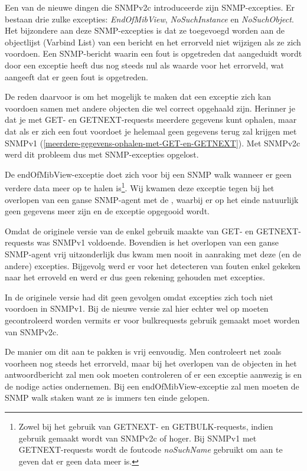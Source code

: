 Een van de nieuwe dingen die SNMPv2c introduceerde zijn SNMP-excepties.
Er bestaan drie zulke excepties: \textit{EndOfMibView}, \textit{NoSuchInstance} en \textit{NoSuchObject}.
Het bijzondere aan deze SNMP-excepties is dat ze toegevoegd worden aan de objectlijst (Varbind List) van een bericht
en het errorveld niet wijzigen als ze zich voordoen\cite{endOfMibView-error-status}.
Een SNMP-bericht waarin een fout is opgetreden dat aangeduidt wordt door een exceptie heeft dus nog steeds nul als waarde voor het errorveld,
wat aangeeft dat er geen fout is opgetreden.

De reden daarvoor is om het mogelijk te maken dat een exceptie zich kan voordoen samen met andere objecten die wel correct opgehaald zijn.
Herinner je dat je met GET- en GETNEXT-requests meerdere gegevens kunt ophalen,
maar dat als er zich een fout voordoet je helemaal geen gegevens terug zal krijgen met SNMPv1 (\cref{meerdere-gegevens-ophalen-met-GET-en-GETNEXT}).
Met SNMPv2c werd dit probleem dus met SNMP-excepties opgelost.

De endOfMibView-exceptie doet zich voor bij een SNMP walk wanneer er geen verdere data meer op te halen is\footnote{
	Zowel bij het gebruik van GETNEXT- en GETBULK-requests, indien gebruik gemaakt wordt van SNMPv2c of hoger.
	Bij SNMPv1 met GETNEXT-requests wordt de foutcode \textit{noSuchName} gebruikt om aan te geven dat er geen data meer is\cite{snmp-exceptions-v2c-to-v1}.
}\cite{snmp-exceptions-explained}.
Wij kwamen deze exceptie tegen bij het overlopen van een ganse SNMP-agent met de \nwmretriever{},
waarbij er op het einde natuurlijk geen gegevens meer zijn en de exceptie opgegooid wordt.

Omdat de originele versie van de \nwmretriever{} enkel gebruik maakte van GET- en GETNEXT-requests was SNMPv1 voldoende.
Bovendien is het overlopen van een ganse SNMP-agent vrij uitzonderlijk dus kwam men nooit in aanraking met deze (en de andere) excepties.
Bijgevolg werd er voor het detecteren van fouten enkel gekeken naar het erroveld en werd er dus geen rekening gehouden met excepties.

In de originele versie had dit geen gevolgen omdat excepties zich toch niet voordoen in SNMPv1.
Bij de nieuwe versie zal hier echter wel op moeten gecontroleerd worden vermits er voor bulkrequests gebruik gemaakt moet worden van SNMPv2c.

De manier om dit aan te pakken is vrij eenvoudig.
Men controleert net zoals voorheen nog steeds het errorveld, maar bij het overlopen van de objecten in het antwoordbericht
zal men ook moeten controleren of er een exceptie aanwezig is en de nodige acties ondernemen.
Bij een endOfMibView-exceptie zal men moeten de SNMP walk staken want ze is immers ten einde gelopen.


